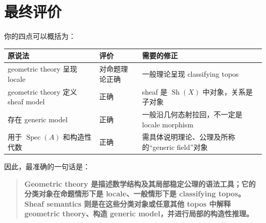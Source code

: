 \documentclass{ctexart}
\begin{document}
\section*{最终评价}

你的四点可以概括为：

\begin{table}[h]
\centering
\begin{tabular}{|p{5cm}|p{4cm}|p{6cm}|}
\hline
\textbf{原说法} & \textbf{评价} & \textbf{需要的修正} \\
\hline
geometric theory 呈现 locale & 对命题理论正确 & 一般理论呈现 classifying topos \\
\hline
geometric theory 定义 sheaf model & 正确 & sheaf 是 \(\operatorname{Sh}(X)\) 中对象，关系是子对象 \\
\hline
存在 generic model & 正确 & 一般沿几何态射拉回，不一定是 locale morphism \\
\hline
用于 \(\operatorname{Spec}(A)\) 和构造性代数 & 正确 & 需具体说明理论、公理及所称的``generic field''对象 \\
\hline
\end{tabular}
\end{table}

因此，最准确的一句话是：

\begin{quote}
\textbf{Geometric theory 是描述数学结构及其局部稳定公理的语法工具；它的分类对象在命题情形下是 locale、一般情形下是 classifying topos。Sheaf semantics 则是在这些分类对象或任意其他 topos 中解释 geometric theory、构造 generic model，并进行局部的构造性推理。}
\end{quote}
\end{document}
